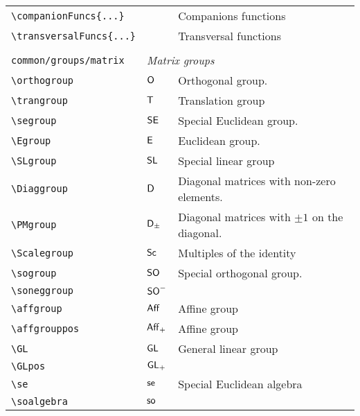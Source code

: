 \begin{longtable}{lll}
 {\color[rgb]{0.5,0.5,0.5}\texttt{\textbackslash companionFuncs\{...\}}} &  &  Companions functions\\ 
 {\color[rgb]{0.5,0.5,0.5}\texttt{\textbackslash transversalFuncs\{...\}}} &  &  Transversal functions\\ 
  &  & \\ 
 {\color[rgb]{0.5,0.5,0.5}\texttt{common/groups/matrix}} & \multicolumn{2}{l}{\emph{Matrix groups}}\\ 
 \hline
{\color[rgb]{0.5,0.5,0.5}\texttt{\textbackslash orthogroup}} & $\mathsf{O}$ &  Orthogonal group.\\ 
 {\color[rgb]{0.5,0.5,0.5}\texttt{\textbackslash trangroup}} & $\mathsf{T}$ &   Translation group\\ 
 {\color[rgb]{0.5,0.5,0.5}\texttt{\textbackslash segroup}} & $\mathsf{SE}$ &  Special Euclidean group.\\ 
 {\color[rgb]{0.5,0.5,0.5}\texttt{\textbackslash Egroup}} & $\mathsf{E}$ &   Euclidean group.\\ 
 {\color[rgb]{0.5,0.5,0.5}\texttt{\textbackslash SLgroup}} & $\mathsf{SL}$ &   Special linear group\\ 
 {\color[rgb]{0.5,0.5,0.5}\texttt{\textbackslash Diaggroup}} & $\mathsf{D}$ &   Diagonal matrices with non-zero elements.\\ 
 {\color[rgb]{0.5,0.5,0.5}\texttt{\textbackslash PMgroup}} & $\mathsf{D}_{\pm}$ &   Diagonal matrices with $\pm 1$ on the diagonal.\\ 
 {\color[rgb]{0.5,0.5,0.5}\texttt{\textbackslash Scalegroup}} & $\mathsf{Sc}$ &   Multiples of the identity\\ 
 {\color[rgb]{0.5,0.5,0.5}\texttt{\textbackslash sogroup}} & $\mathsf{SO}$ &  Special orthogonal group.\\ 
 {\color[rgb]{0.5,0.5,0.5}\texttt{\textbackslash soneggroup}} & $\mathsf{SO}^{-}$ & \\ 
 {\color[rgb]{0.5,0.5,0.5}\texttt{\textbackslash affgroup}} & $\mathsf{Aff}$ &  Affine group \\ 
 {\color[rgb]{0.5,0.5,0.5}\texttt{\textbackslash affgrouppos}} & $\mathsf{Aff}_{+}$ &  Affine group \\ 
 {\color[rgb]{0.5,0.5,0.5}\texttt{\textbackslash GL}} & $\mathsf{GL}$ &  General linear group\\ 
 {\color[rgb]{0.5,0.5,0.5}\texttt{\textbackslash GLpos}} & $\mathsf{GL}_{+}$ &  \\ 
 {\color[rgb]{0.5,0.5,0.5}\texttt{\textbackslash se}} & $\mathsf{se}$ &  Special Euclidean algebra\\ 
 {\color[rgb]{0.5,0.5,0.5}\texttt{\textbackslash soalgebra}} & $\mathsf{so}$ & \\ 

\end{longtable}
